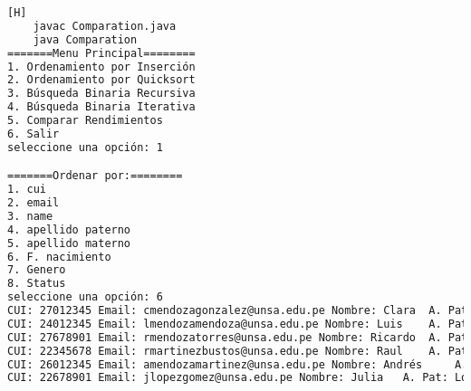         \begin{lstlisting}[language=bash,caption={Compilación y ejecución del código}][H]
    javac Comparation.java
    java Comparation
=======Menu Principal========
1. Ordenamiento por Inserción
2. Ordenamiento por Quicksort
3. Búsqueda Binaria Recursiva
4. Búsqueda Binaria Iterativa
5. Comparar Rendimientos
6. Salir
seleccione una opción: 1

=======Ordenar por:========
1. cui
2. email
3. name
4. apellido paterno
5. apellido materno
6. F. nacimiento
7. Genero
8. Status
seleccione una opción: 6
CUI: 27012345 Email: cmendozagonzalez@unsa.edu.pe Nombre: Clara	 A. Pat: Mendoza A. Mat: Gonzalez Fecha de Nacimiento: 1986-12-21 Genero: 0 Estado: 0
CUI: 24012345 Email: lmendozamendoza@unsa.edu.pe Nombre: Luis	 A. Pat: Mendoza A. Mat: Mendoza Fecha de Nacimiento: 1987-01-09 Genero: 1 Estado: 0
CUI: 27678901 Email: rmendozatorres@unsa.edu.pe Nombre: Ricardo	 A. Pat: Mendoza A. Mat: Torres Fecha de Nacimiento: 1988-08-03 Genero: 1 Estado: 1
CUI: 22345678 Email: rmartinezbustos@unsa.edu.pe Nombre: Raul	 A. Pat: Martinez A. Mat: Bustos Fecha de Nacimiento: 1988-10-30 Genero: 1 Estado: 1
CUI: 26012345 Email: amendozamartinez@unsa.edu.pe Nombre: Andrés	 A. Pat: Mendoza A. Mat: Martinez Fecha de Nacimiento: 1989-11-08 Genero: 1 Estado: 1
CUI: 22678901 Email: jlopezgomez@unsa.edu.pe Nombre: Julia	 A. Pat: Lopez A. Mat: Gomez Fecha de Nacimiento: 1990-03-07 Genero: 0 Estado: 0

  \end{lstlisting}

